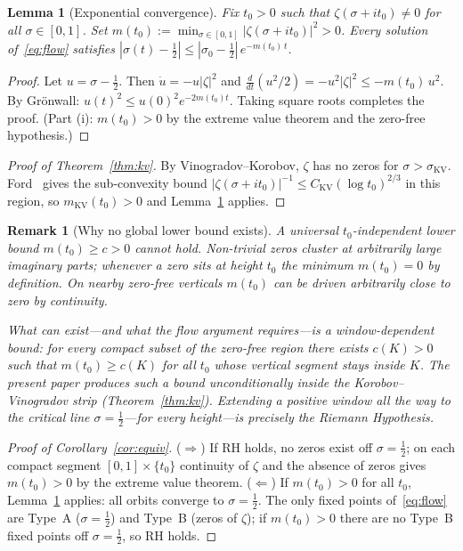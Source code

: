 \documentclass[11pt]{article}
\newtheorem{lemma}{Lemma}
\newtheorem{remark}{Remark}
\begin{document}
\begin{lemma}[Exponential convergence]\label{lem:main}
Fix $t_0>0$ such that $\zeta(\sigma+it_0)\neq0$ for all $\sigma\in[0,1]$.
Set $m(t_0):=\min_{\sigma\in[0,1]}|\zeta(\sigma+it_0)|^2>0$.
Every solution of~\eqref{eq:flow} satisfies
$|\sigma(t)-\tfrac12|\le|\sigma_0-\tfrac12|\,e^{-m(t_0)\,t}$.
\end{lemma}

\begin{proof}
Let $u=\sigma-\tfrac12$.
Then $\dot u=-u|\zeta|^2$ and
$\tfrac{d}{dt}(u^2/2)=-u^2|\zeta|^2\le-m(t_0)\,u^2$.
By Gr\"onwall: $u(t)^2\le u(0)^2e^{-2m(t_0)t}$.
Taking square roots completes the proof.
(Part (i): $m(t_0)>0$ by the extreme value theorem and the
zero-free hypothesis.)
\end{proof}

\begin{proof}[Proof of Theorem~\ref{thm:kv}]
By Vinogradov--Korobov, $\zeta$ has no zeros for $\sigma>\sigma_{\mathrm{KV}}$.
Ford~\cite{ford} gives the sub-convexity bound
$|\zeta(\sigma+it_0)|^{-1}\le C_{\mathrm{KV}}(\log t_0)^{2/3}$ in this
region, so $m_{\mathrm{KV}}(t_0)>0$ and Lemma~\ref{lem:main} applies.
\end{proof}

\begin{remark}[Why no global lower bound exists]\label{rem:nobound}
A \emph{universal} $t_0$-independent lower bound
$m(t_0)\ge c>0$ cannot hold.  Non-trivial zeros cluster at
arbitrarily large imaginary parts; whenever a zero sits at height $t_0$
the minimum $m(t_0)=0$ by definition.  On nearby zero-free verticals
$m(t_0)$ can be driven arbitrarily close to zero by continuity.

What can exist—and what the flow argument requires—is a
\emph{window-dependent} bound: for every compact subset of the
zero-free region there exists $c(K)>0$ such that $m(t_0)\ge c(K)$
for all $t_0$ whose vertical segment stays inside $K$.  The present
paper produces such a bound unconditionally inside the Korobov--Vinogradov
strip (Theorem~\ref{thm:kv}).  Extending a positive window all the way
to the critical line $\sigma=\tfrac12$—for \emph{every} height—is
precisely the Riemann Hypothesis.
\end{remark}

\begin{proof}[Proof of Corollary~\ref{cor:equiv}]
($\Rightarrow$) If RH holds, no zeros exist off $\sigma=\tfrac12$;
on each compact segment $[0,1]\times\{t_0\}$ continuity of $\zeta$
and the absence of zeros gives $m(t_0)>0$ by the extreme value theorem.
($\Leftarrow$) If $m(t_0)>0$ for all $t_0$, Lemma~\ref{lem:main}
applies: all orbits converge to $\sigma=\tfrac12$.
The only fixed points of~\eqref{eq:flow} are Type~A ($\sigma=\tfrac12$)
and Type~B (zeros of $\zeta$); if $m(t_0)>0$ there are no Type~B fixed
points off $\sigma=\tfrac12$, so RH holds.
\end{proof}
\end{document}

